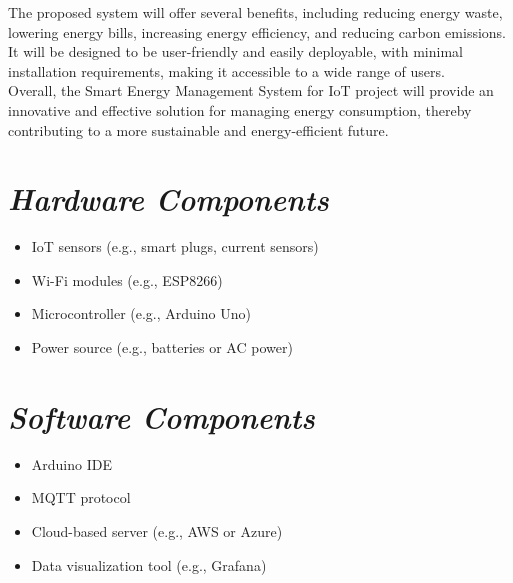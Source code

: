 \documentclass{article}
\begin{document}
The proposed system will offer several benefits, including reducing energy waste, lowering energy bills, increasing energy efficiency, and reducing carbon emissions. It will be designed to be user-friendly and easily deployable, with minimal installation requirements, making it accessible to a wide range of users.\\

Overall, the Smart Energy Management System for IoT project will provide an innovative and effective solution for managing energy consumption, thereby contributing to a more sustainable and energy-efficient future.
\section*{\textit{Hardware Components}}
\begin{itemize}
    \item IoT sensors (e.g., smart plugs, current sensors)
    \item Wi-Fi modules (e.g., ESP8266)
    \item Microcontroller (e.g., Arduino Uno)
    \item Power source (e.g., batteries or AC power)
\end{itemize}
\section*{\textit{Software Components}}
\begin{itemize}
    \item Arduino IDE
    \item MQTT protocol
    \item Cloud-based server (e.g., AWS or Azure)
    \item Data visualization tool (e.g., Grafana)
\end{itemize}
\end{document}

